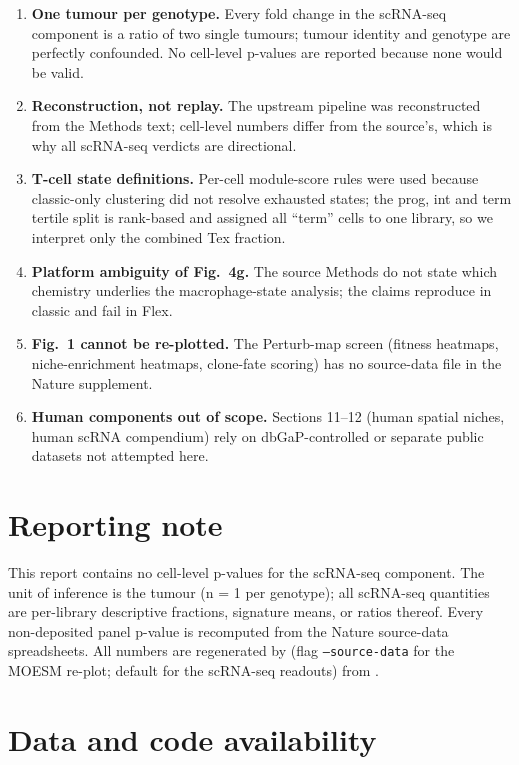 \documentclass[preprint,12pt]{elsarticle}
\begin{document}
\begin{enumerate}
\item \textbf{One tumour per genotype.} Every fold change in the
scRNA-seq component is a ratio of two single tumours; tumour
identity and genotype are perfectly confounded. No cell-level
p-values are reported because none would be valid.
\item \textbf{Reconstruction, not replay.} The upstream pipeline
was reconstructed from the Methods text; cell-level numbers
differ from the source's, which is why all scRNA-seq verdicts are
directional.
\item \textbf{T-cell state definitions.} Per-cell module-score
rules were used because classic-only clustering did not resolve
exhausted states; the prog, int and term tertile split is rank-based
and assigned all ``term'' cells to one library, so we interpret
only the combined Tex fraction.
\item \textbf{Platform ambiguity of Fig.~4g.} The source Methods
do not state which chemistry underlies the macrophage-state
analysis; the claims reproduce in classic and fail in Flex.
\item \textbf{Fig.~1 cannot be re-plotted.} The Perturb-map
screen (fitness heatmaps, niche-enrichment heatmaps, clone-fate
scoring) has no source-data file in the Nature supplement.
\item \textbf{Human components out of scope.} Sections 11--12
(human spatial niches, human scRNA compendium) rely on
dbGaP-controlled or separate public datasets not attempted here.
\end{enumerate}

\section*{Reporting note}

This report contains no cell-level p-values for the scRNA-seq
component. The unit of inference is the tumour (n = 1 per
genotype); all scRNA-seq quantities are per-library descriptive
fractions, signature means, or ratios thereof. Every non-deposited
panel p-value is recomputed from the Nature source-data
spreadsheets. All numbers are regenerated by
 (flag
\texttt{--source-data} for the MOESM re-plot; default for the
scRNA-seq readouts) from
.

\section*{Data and code availability}
\end{document}
